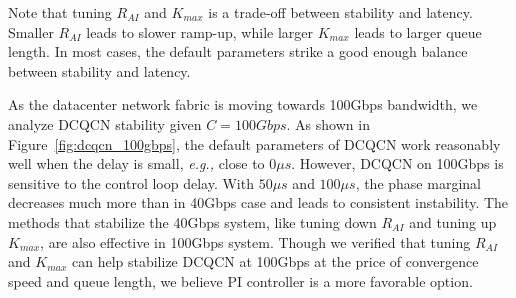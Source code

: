 Note that tuning $R_{AI}$ and $K_{max}$ is a trade-off between stability and
latency. Smaller $R_{AI}$ leads to slower ramp-up, while larger $K_{max}$ leads
to larger queue length. In most cases, the default parameters strike a good
enough balance between stability and latency.

  As the datacenter network fabric is moving
towards 100Gbps bandwidth, we analyze DCQCN stability given $C=100Gbps$. As
shown in Figure~\ref{fig:dcqcn_100gbps}, the default parameters of DCQCN work
reasonably well when the delay is small, {\em e.g.,} close to $0\mu s$.
However, DCQCN on 100Gbps is sensitive to the control loop delay. With
$50\mu s$ and $100\mu s$, the phase marginal decreases much more than in 40Gbps
case and leads to consistent instability.  The methods that stabilize the 40Gbps
system, like tuning down $R_{AI}$ and tuning up $K_{max}$, are also effective in
100Gbps system. Though we verified that tuning $R_{AI}$ and $K_{max}$
can help stabilize DCQCN at 100Gbps at the price of convergence speed and queue length, 
we believe PI controller is a more favorable option.
